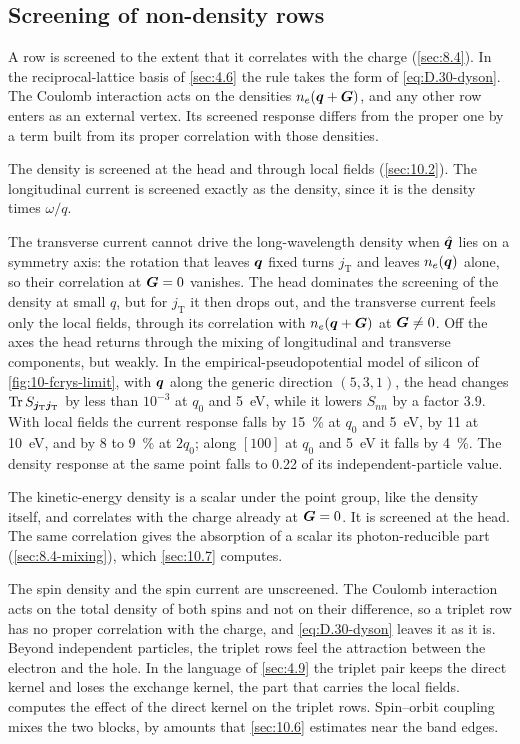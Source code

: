 \subsection{Screening of non-density rows}\label{sec:10.4-screening}

A row is screened to the extent that it correlates with the charge (\cref{sec:8.4}). In the reciprocal-lattice basis of \cref{sec:4.6} the rule takes the form of \cref{eq:D.30-dyson}. The Coulomb interaction acts on the densities $n_e(\bm{q} + \bm{G})$, and any other row enters as an external vertex. Its screened response differs from the proper one by a term built from its proper correlation with those densities.

The density is screened at the head and through local fields (\cref{sec:10.2}). The longitudinal current is screened exactly as the density, since it is the density times $\omega/q$.

The transverse current cannot drive the long-wavelength density when $\hat{\bm{q}}$ lies on a symmetry axis: the rotation that leaves $\bm{q}$ fixed turns $j_{\mathrm{T}}$ and leaves $n_e(\bm{q})$ alone, so their correlation at $\bm{G} = 0$ vanishes. The head dominates the screening of the density at small $q$, but for $j_{\mathrm{T}}$ it then drops out, and the transverse current feels only the local fields, through its correlation with $n_e(\bm{q} + \bm{G})$ at $\bm{G} \neq 0$. Off the axes the head returns through the mixing of longitudinal and transverse components, but weakly. In the empirical-pseudopotential model of silicon of \cref{fig:10-fcrys-limit}, with $\bm{q}$ along the generic direction $(5,3,1)$, the head changes $\operatorname{Tr} S_{\bm{j}_{\mathrm{T}}\bm{j}_{\mathrm{T}}}$ by less than $10^{-3}$ at $q_0$ and \SI{5}{eV}, while it lowers $S_{nn}$ by a factor 3.9. With local fields the current response falls by \SI{15}{\percent} at $q_0$ and \SI{5}{eV}, by 11 at \SI{10}{eV}, and by 8 to \SI{9}{\percent} at $2q_0$; along $[100]$ at $q_0$ and \SI{5}{eV} it falls by \SI{4}{\percent}. The density response at the same point falls to 0.22 of its independent-particle value.

The kinetic-energy density is a scalar under the point group, like the density itself, and correlates with the charge already at $\bm{G} = 0$. It is screened at the head. The same correlation gives the absorption of a scalar its photon-reducible part (\cref{sec:8.4-mixing}), which \cref{sec:10.7} computes.

The spin density and the spin current are unscreened. The Coulomb interaction acts on the total density of both spins and not on their difference, so a triplet row has no proper correlation with the charge, and \cref{eq:D.30-dyson} leaves it as it is. Beyond independent particles, the triplet rows feel the attraction between the electron and the hole. In the language of \cref{sec:4.9} the triplet pair keeps the direct kernel and loses the exchange kernel, the part that carries the local fields.  computes the effect of the direct kernel on the triplet rows. Spin--orbit coupling mixes the two blocks, by amounts that \cref{sec:10.6} estimates near the band edges.

